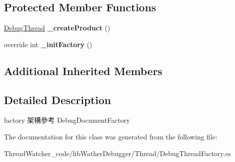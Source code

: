 \subsection*{Protected Member Functions}
\begin{DoxyCompactItemize}
\item 
\hypertarget{classlib_wather_debugger_1_1_thread_1_1_debug_thread_factory_a0c08b3d09435a80d48625a5fde530776}{\hyperlink{classlib_wather_debugger_1_1_thread_1_1_debug_thread}{Debug\+Thread} {\bfseries \+\_\+create\+Product} ()}\label{classlib_wather_debugger_1_1_thread_1_1_debug_thread_factory_a0c08b3d09435a80d48625a5fde530776}

\item 
\hypertarget{classlib_wather_debugger_1_1_thread_1_1_debug_thread_factory_a86f793d03df3f38b02d10eacbf52816c}{override int {\bfseries \+\_\+init\+Factory} ()}\label{classlib_wather_debugger_1_1_thread_1_1_debug_thread_factory_a86f793d03df3f38b02d10eacbf52816c}

\end{DoxyCompactItemize}
\subsection*{Additional Inherited Members}


\subsection{Detailed Description}
factory 架構參考 Debug\+Document\+Factory 



The documentation for this class was generated from the following file\+:\begin{DoxyCompactItemize}
\item 
Thread\+Watcher\+\_\+code/lib\+Wather\+Debugger/\+Thread/Debug\+Thread\+Factory.\+cs\end{DoxyCompactItemize}
